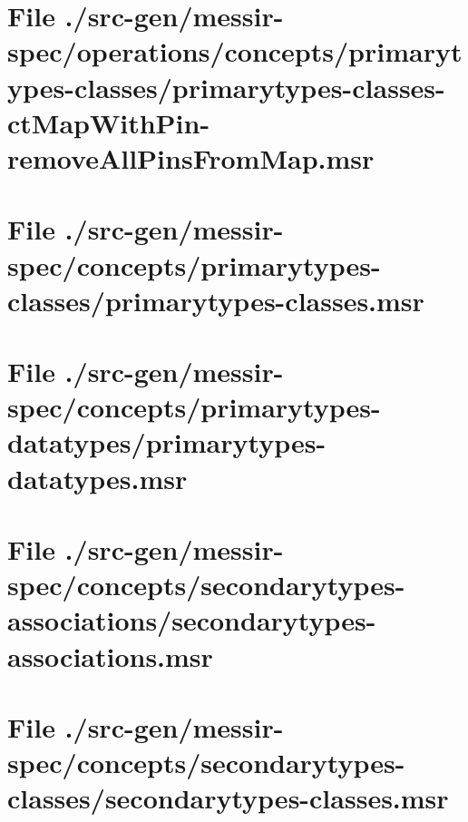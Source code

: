 \section[File /src-gen.../primarytypes-classes-ctMapWithPin-removeAllPinsFromMap.msr]{File ./src-gen/messir-spec/operations/concepts/primarytypes-classes/primarytypes-classes-ctMapWithPin-removeAllPinsFromMap.msr}
\scriptsize

\normalsize
	
\section[File /src-gen/messir-spec/concepts/primarytypes-classes/primarytypes-classes.msr]{File ./src-gen/messir-spec/concepts/primarytypes-classes/primarytypes-classes.msr}
\scriptsize

\normalsize
	
\section[File /src-gen/messir-spec/concepts.../primarytypes-datatypes.msr]{File ./src-gen/messir-spec/concepts/primarytypes-datatypes/primarytypes-datatypes.msr}
\scriptsize

\normalsize
	
\section[File /src-gen/messir-spec/concepts.../secondarytypes-associations.msr]{File ./src-gen/messir-spec/concepts/secondarytypes-associations/secondarytypes-associations.msr}
\scriptsize

\normalsize
	
\section[File /src-gen/messir-spec/concepts.../secondarytypes-classes.msr]{File ./src-gen/messir-spec/concepts/secondarytypes-classes/secondarytypes-classes.msr}
\scriptsize

\normalsize
	
